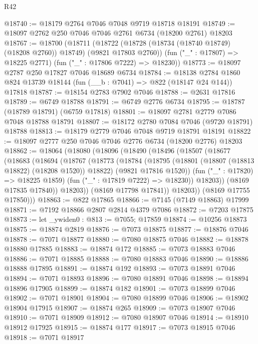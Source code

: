 \begin{lexlean}{R42}
\begin{coremodule}
{@18740 := @18179 @2764 @7046 @7048 @9719 @18718 @18191
@18749 := @18097 @2762 @250 @7046 @7046 @2761 @6734 (@18200 @2761) @18203
@18767 := @18700
    (@18711
      (@18722 (@18728 (@18734 (@18740 @18749) (@18208 @2760)) @18749) (@9821 @17803 @2760))
      (fun ("_" : @17807) => @18225 @2771)
      (fun ("_" : @17806 @7222) => @18230))
@18773 := @18097 @2787 @250 @17827 @7046 @18689 @6734
@18784 := @18138 @2784 @1860 @824 @13739 @18144 (fun (__b : @7041) => @822 (@18147 @24 @144)) @17818
@18787 := @18154 @2783 @7902 @7046
@18788 := @2631 @17816
@18789 := @6749 @18788
@18791 := @6749 @2776 @6734
@18795 := @18787 (@18789 @18791) (@6759 @17818)
@18801 := @18097 @2781 @2779 @7086 @7048 @18788 @18791
@18807 := @18172 @2780 @7084 @7046 (@9720 @18791) @18788
@18813 := @18179 @2779 @7046 @7048 @9719 @18791 @18191
@18822 := @18097 @2777 @250 @7046 @7046 @2776 @6734 (@18200 @2776) @18203
@18862 := @18064
    (@18080
      (@18096
        (@18490
          (@18496
            (@18507
              (@18677
                (@18683
                  (@18694
                    (@18767
                      (@18773
                        (@18784
                          (@18795
                            (@18801 (@18807 (@18813 @18822) (@18208 @1520)) @18822)
                            (@9821 @17816 @1520))
                          (fun ("_" : @17820) => @18225 @1859)
                          (fun ("_" : @17819 @7222) => @18230))
                        @18203))
                    (@8169 @17835 @17840))
                  @18203))
              (@8169 @17798 @17841))
            @18203))
        (@8169 @17755 @17850)))
@18863 := @822 @17865
@18866 := @7145 (@7149 @18863) @17999
@18871 := @7192 @18866 @2807 @2814 @4379 @7086
@18872 := @7203 @17875
@18873 := let _ywiden0 : @813 := @7055; @17859
@18874 := @10256 @18873
@18875 := @18874 @2819
@18876 := @7073 @18875
@18877 := @18876 @7046
@18878 := @7071 @18877
@18880 := @7080 @18875 @7046
@18882 := @18878 @18880 @17885
@18883 := @18874 @172
@18885 := @7073 @18883 @7046
@18886 := @7071 @18885
@18888 := @7080 @18883 @7046
@18890 := @18886 @18888 @17895
@18891 := @18874 @192
@18893 := @7073 @18891 @7046
@18894 := @7071 @18893
@18896 := @7080 @18891 @7046
@18898 := @18894 @18896 @17905
@18899 := @18874 @182
@18901 := @7073 @18899 @7046
@18902 := @7071 @18901
@18904 := @7080 @18899 @7046
@18906 := @18902 @18904 @17915
@18907 := @18874 @265
@18909 := @7073 @18907 @7046
@18910 := @7071 @18909
@18912 := @7080 @18907 @7046
@18914 := @18910 @18912 @17925
@18915 := @18874 @177
@18917 := @7073 @18915 @7046
@18918 := @7071 @18917
}
\end{coremodule}
\end{lexlean}
